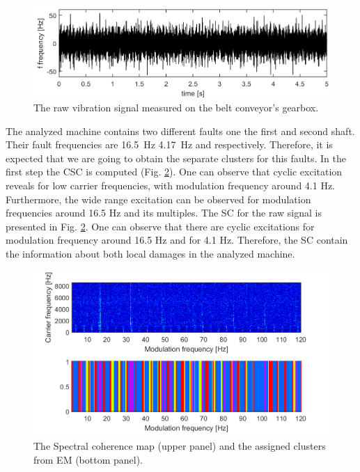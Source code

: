 \documentclass[11pt]{article}
\begin{document}
\begin{figure}[h!]
\begin{center}
\includegraphics[width=\textwidth]{wykresy/_sygnal.png}
\caption{The raw vibration signal measured on the belt conveyor's gearbox.}
\label{fig:raw_signal}
\end{center}
\end{figure}
The analyzed machine contains two different faults one the first and second shaft. Their fault frequencies are 16.5~Hz  4.17~Hz and respectively. Therefore, it is expected that we are going to obtain the separate clusters for this faults. In the first step the CSC is computed (Fig. \ref{fig:SC}). One can observe that cyclic excitation reveals for low carrier frequencies, with modulation frequency around 4.1 Hz. Furthermore, the wide range excitation can be observed for modulation frequencies around 16.5 Hz and its multiples. The SC for the raw signal is presented in Fig. \ref{fig:SC}. One can observe that there are cyclic excitations for modulation frequency around 16.5 Hz and for 4.1 Hz. Therefore, the SC contain the information about both local damages in the analyzed machine.
%
\begin{figure}[h!]
\begin{center}
\includegraphics[width=\textwidth]{wykresy/212_SC_clusters.png}
\caption{The Spectral coherence map (upper panel) and the assigned clusters from EM (bottom panel).}
\label{fig:SC}
\end{center}
\end{figure}
\end{document}
